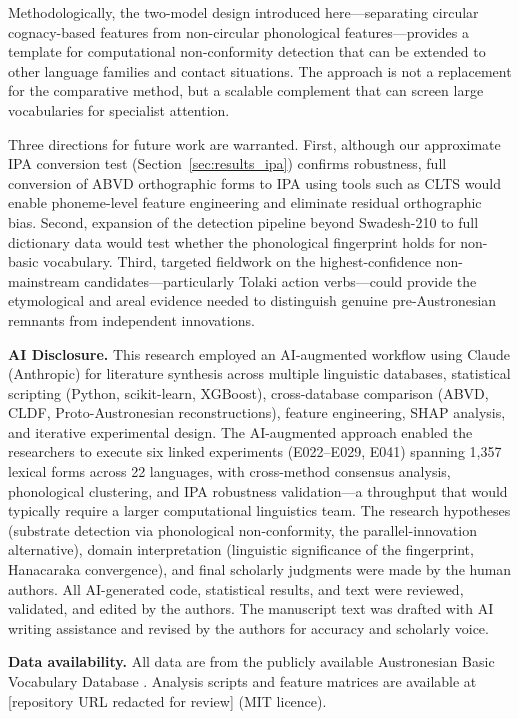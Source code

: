 \documentclass[12pt]{article}
\begin{document}
Methodologically, the two-model design introduced here---separating circular cognacy-based features from non-circular phonological features---provides a template for computational non-conformity detection that can be extended to other language families and contact situations.
The approach is not a replacement for the comparative method, but a scalable complement that can screen large vocabularies for specialist attention.

Three directions for future work are warranted.
First, although our approximate IPA conversion test (Section~\ref{sec:results_ipa}) confirms robustness, full conversion of ABVD orthographic forms to IPA using tools such as CLTS \citep{anderson2018} would enable phoneme-level feature engineering and eliminate residual orthographic bias.
Second, expansion of the detection pipeline beyond Swadesh-210 to full dictionary data would test whether the phonological fingerprint holds for non-basic vocabulary.
Third, targeted fieldwork on the highest-confidence non-mainstream candidates---particularly Tolaki action verbs---could provide the etymological and areal evidence needed to distinguish genuine pre-Austronesian remnants from independent innovations.

\vspace{1em}
\noindent\textbf{AI Disclosure.}
This research employed an AI-augmented workflow using Claude (Anthropic) for literature synthesis across multiple linguistic databases, statistical scripting (Python, scikit-learn, XGBoost), cross-database comparison (ABVD, CLDF, Proto-Austronesian reconstructions), feature engineering, SHAP analysis, and iterative experimental design.
The AI-augmented approach enabled the researchers to execute six linked experiments (E022--E029, E041) spanning 1,357 lexical forms across 22 languages, with cross-method consensus analysis, phonological clustering, and IPA robustness validation---a throughput that would typically require a larger computational linguistics team.
The research hypotheses (substrate detection via phonological non-conformity, the parallel-innovation alternative), domain interpretation (linguistic significance of the fingerprint, Hanacaraka convergence), and final scholarly judgments were made by the human authors.
All AI-generated code, statistical results, and text were reviewed, validated, and edited by the authors.
The manuscript text was drafted with AI writing assistance and revised by the authors for accuracy and scholarly voice.

\vspace{1em}
\noindent\textbf{Data availability.} All data are from the publicly available Austronesian Basic Vocabulary Database \citep{greenhill2008}. Analysis scripts and feature matrices are available at [repository URL redacted for review] (MIT licence).


\end{document}
